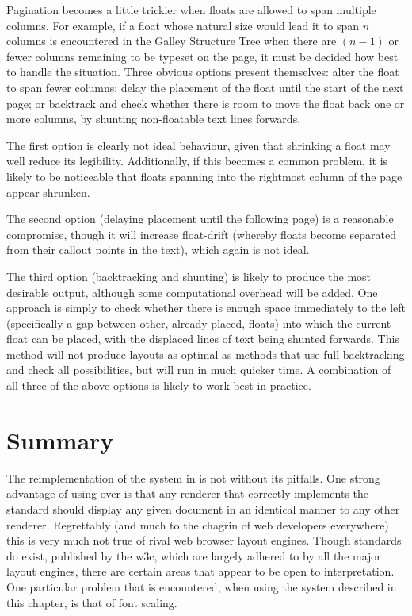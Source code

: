 Pagination becomes a little trickier when floats are allowed to span multiple columns. For example, if a float whose natural size would lead it to span $n$ columns is encountered in the Galley Structure Tree when there are $(n-1)$ or fewer columns remaining to be typeset on the page, it must be decided how best to handle the situation. Three obvious options present themselves: alter the float to span fewer columns; delay the placement of the float until the start of the next page; or backtrack and check whether there is room to move the float back one or more columns, by shunting non-floatable text lines forwards.

The first option is clearly not ideal behaviour, given that shrinking a float may well reduce its legibility. Additionally, if this becomes a common problem, it is likely to be noticeable that floats spanning into the rightmost column of the page appear shrunken.

The second option (delaying placement until the following page) is a reasonable compromise, though it will increase float-drift (whereby floats become separated from their callout points in the text), which again is not ideal.

The third option (backtracking and shunting) is likely to produce the most desirable output, although some computational overhead will be added. One approach is simply to check whether there is enough space immediately to the left (specifically a gap between other, already placed, floats) into which the current float can be placed, with the displaced lines of text being shunted forwards. This method will not produce layouts as optimal as methods that use full backtracking and check all possibilities, but will run in much quicker time. A combination of all three of the above options is likely to work best in practice.



\section{Summary}

The reimplementation of the system in \html{} is not without its pitfalls. One strong advantage of using \pdf{} over \html{} is that any \pdf{} renderer that correctly implements the standard\cite{Adobe2001} should display any given document in an identical manner to any other renderer. Regrettably (and much to the chagrin of web developers everywhere) this is very much not true of rival web browser layout engines. Though standards do exist, published by the \gls{w3c}, which are largely adhered to by all the major layout engines, there are certain areas that appear to be open to interpretation. One particular problem that is encountered, when using the system described in this chapter, is that of font scaling. 

